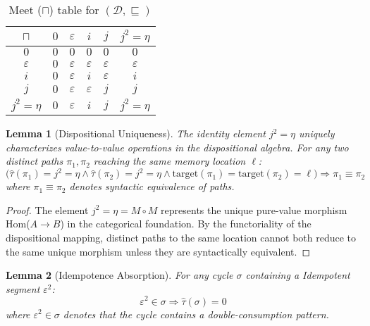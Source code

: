 \documentclass[acmsmall,anonymous,review,screen]{acmart}
\newtheorem{lemma}{Lemma}
\begin{document}
\begin{table}[t]
    \centering
    \caption{Meet ($\sqcap$) table for $(\mathcal{D},\sqsubseteq)$}
    \label{tab:meet}
    \begin{tabular}{c|ccccc}
        \toprule
        $\sqcap$ & $0$ & $\varepsilon$ & $i$ & $j$ & $j^{2} = \eta$\\
        \midrule
        $0$ & $0$ & $0$ & $0$ & $0$ & $0$\\
        $\varepsilon$ & $0$ & $\varepsilon$ & $\varepsilon$ & $\varepsilon$ & $\varepsilon$\\
        $i$ & $0$ & $\varepsilon$ & $i$ & $\varepsilon$ & $i$\\
        $j$ & $0$ & $\varepsilon$ & $\varepsilon$ & $j$ & $j$\\
        $j^{2} = \eta$ & $0$ & $\varepsilon$ & $i$ & $j$ & $j^{2} = \eta$\\
        \bottomrule
    \end{tabular}
\end{table}

	
	\begin{lemma}[Dispositional Uniqueness]
		\label{lem:uniqueness}
		The identity element $j^{2} = \eta$ uniquely characterizes value-to-value operations in the dispositional algebra. For any two distinct paths $\pi_1, \pi_2$ reaching the same memory location $\ell$:
		\begin{equation}
			\big(\hat{\tau}(\pi_1) = j^{2} = \eta \land \hat{\tau}(\pi_2) = j^{2} = \eta \land \text{target}(\pi_1) = \text{target}(\pi_2) = \ell\big) \Rightarrow \pi_1 \equiv \pi_2
		\end{equation}
		where $\pi_1 \equiv \pi_2$ denotes syntactic equivalence of paths.
	\end{lemma}
	
	\begin{proof}
		The element $j^{2} = \eta = M \circ M$ represents the unique pure-value morphism Hom($A \to B$) in the categorical foundation. By the functoriality of the dispositional mapping, distinct paths to the same location cannot both reduce to the same unique morphism unless they are syntactically equivalent.
	\end{proof}
	
	\begin{lemma}[Idempotence Absorption]
		\label{lem:Idempotence}
		For any cycle $\sigma$ containing a Idempotent segment $\varepsilon^2$:
		$$\varepsilon^2 \in \sigma \Rightarrow \hat{\tau}(\sigma) = 0$$
		where $\varepsilon^2 \in \sigma$ denotes that the cycle contains a double-consumption pattern.
	\end{lemma}
	
\end{document}
